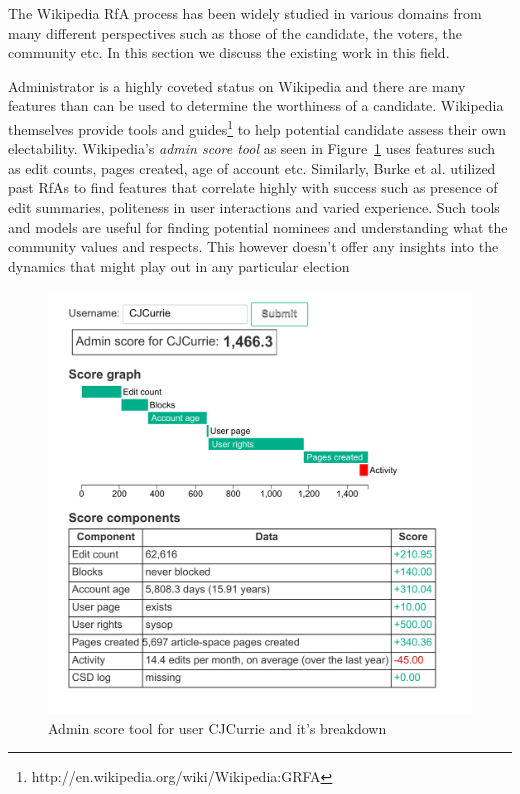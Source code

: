 
The Wikipedia RfA process has been widely studied in various domains from many different perspectives such as those of the candidate, the voters, the community etc. In this section we discuss the existing work in this field.
\smallskip

Administrator is a highly coveted status on Wikipedia and there are many features than can be used to determine the worthiness of a candidate. Wikipedia themselves provide tools and guides\footnote{http://en.wikipedia.org/wiki/Wikipedia:GRFA} to help potential candidate assess their own electability. Wikipedia's \textit{admin score tool} as seen in Figure~\ref{fig:admin-score} uses features such as edit counts, pages created, age of account etc. Similarly, Burke et al. \cite{BurkeMoppingUp} utilized past RfAs to find features that correlate highly with success such as presence of edit summaries, politeness in user interactions and varied experience. Such tools and models are useful for finding potential nominees and understanding what the community values and respects. This however doesn't offer any insights into the dynamics that might play out in any particular election
\begin{figure}[h!]
    \centering
    \includegraphics[width=\linewidth]{images/Asynchronous Admin Score.pdf}
    \caption{Admin score tool for user CJCurrie and it's breakdown}
    \label{fig:admin-score}
\end{figure}
\smallskip

